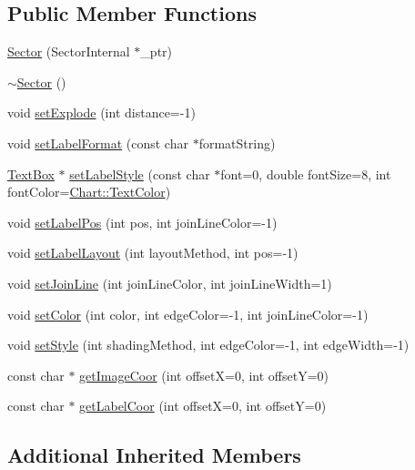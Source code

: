 \subsection*{Public Member Functions}
\begin{DoxyCompactItemize}
\item 
\hyperlink{class_sector_a1649735a193918272eaa6dcc08e61ece}{Sector} (Sector\+Internal $\ast$\+\_\+ptr)
\item 
\hyperlink{class_sector_aa0f54aaf079dd7461400684bf0be15ff}{$\sim$\+Sector} ()
\item 
void \hyperlink{class_sector_ac3823667b60cbbb1ca4b632df50fc022}{set\+Explode} (int distance=-\/1)
\item 
void \hyperlink{class_sector_a90150f5f741fe157f074703a29554f38}{set\+Label\+Format} (const char $\ast$format\+String)
\item 
\hyperlink{class_text_box}{Text\+Box} $\ast$ \hyperlink{class_sector_ad9a4226a9824942b7d4d753f97a0f03b}{set\+Label\+Style} (const char $\ast$font=0, double font\+Size=8, int font\+Color=\hyperlink{namespace_chart_abee0d882fdc9ad0b001245ad9fc64011a879e14f2f5024caccc047374342321ef}{Chart\+::\+Text\+Color})
\item 
void \hyperlink{class_sector_ac09478340cba279b7cbaff69b5fc828f}{set\+Label\+Pos} (int pos, int join\+Line\+Color=-\/1)
\item 
void \hyperlink{class_sector_a9a658aff9d425de147c28351747468ab}{set\+Label\+Layout} (int layout\+Method, int pos=-\/1)
\item 
void \hyperlink{class_sector_aec43c56a8b06d90ff6e0b8fa53b057dd}{set\+Join\+Line} (int join\+Line\+Color, int join\+Line\+Width=1)
\item 
void \hyperlink{class_sector_abefbb2367df8444cdd3ff35a92d9125c}{set\+Color} (int color, int edge\+Color=-\/1, int join\+Line\+Color=-\/1)
\item 
void \hyperlink{class_sector_a77d33f22f2a3b3e526c848ce17ff82d6}{set\+Style} (int shading\+Method, int edge\+Color=-\/1, int edge\+Width=-\/1)
\item 
const char $\ast$ \hyperlink{class_sector_a1633502a6429c3dd568b74c9c1927d09}{get\+Image\+Coor} (int offsetX=0, int offsetY=0)
\item 
const char $\ast$ \hyperlink{class_sector_adb9923715403a28445bfffb77a4e05a1}{get\+Label\+Coor} (int offsetX=0, int offsetY=0)
\end{DoxyCompactItemize}
\subsection*{Additional Inherited Members}


